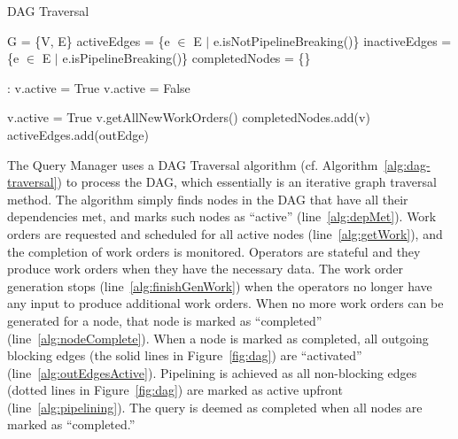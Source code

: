 \begin{algorithm}[t]
	\caption{DAG Traversal}
	\begin{algorithmic}[1]
		\State G = \{V, E\}
		\State activeEdges = \{e $\in$ E $|$ e.isNotPipelineBreaking()\}
		\label{alg:pipelining}
		\State inactiveEdges = \{e $\in$ E $|$ e.isPipelineBreaking()\}
		\State completedNodes = \{\}
		
		:
				\State v.active = True
			\Else
				\State v.active = False
			\EndIf
		\EndFor
		
			\State v.active = True \label{alg:depMet}
		\EndIf
		\State v.getAllNewWorkOrders() \label{alg:getWork}
		 \label{alg:finishGenWork}
		\State completedNodes.add(v) \label{alg:nodeComplete}
		\State activeEdges.add(outEdge)\label{alg:outEdgesActive}
		\EndFor
		\EndIf
		\EndIf
		\EndFor	
		\EndWhile
	\end{algorithmic}
	\label{alg:dag-traversal}
\end{algorithm}

The Query Manager uses a DAG Traversal algorithm (cf. Algorithm~\ref{alg:dag-traversal}) to process the DAG, which essentially is an iterative graph traversal method. 
The algorithm simply finds nodes in the DAG that have all their dependencies met, and marks such nodes as ``active'' (line~\ref{alg:depMet}).
Work orders are requested and scheduled for all active nodes (line~\ref{alg:getWork}), and 
the completion of work orders is monitored. 
Operators are stateful and they produce work orders when they have the necessary data.
The work order generation stops (line~\ref{alg:finishGenWork}) when the operators no longer have any input to produce additional work orders.
When no more work orders can be generated for a node, that node is marked as 
``completed'' (line~\ref{alg:nodeComplete}). 
When a node is marked as completed, all outgoing blocking edges (the solid lines 
in Figure~\ref{fig:dag}) are ``activated'' (line~\ref{alg:outEdgesActive}). 
Pipelining is achieved as all non-blocking edges (dotted lines in 
Figure~\ref{fig:dag}) are marked as active upfront (line~\ref{alg:pipelining}).
The query is deemed as completed when all nodes are marked as ``completed.''

